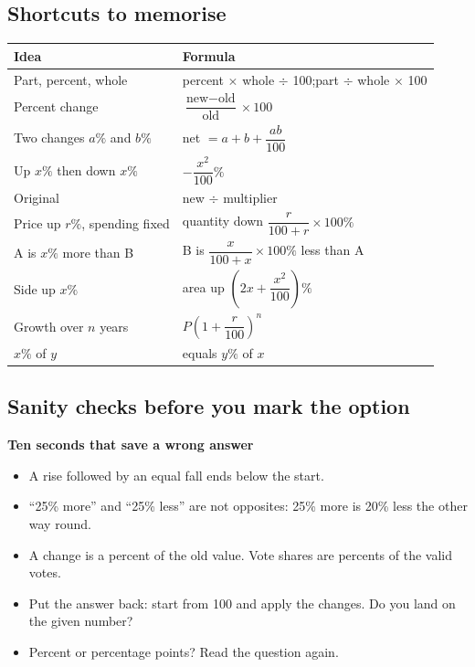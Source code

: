 \documentclass[11pt,a4paper]{article}
\let\oldsubsection\subsection
\renewcommand{\subsection}{\needspace{9\baselineskip}\oldsubsection}
\newcommand{\infobox}[2]{\par\medskip\noindent\begingroup\setlength{\fboxsep}{7pt}%
  \colorbox{codebg}{\parbox{\dimexpr\linewidth-14pt\relax}{\textbf{\color{ember}#1}\par\smallskip #2}}\endgroup\par\medskip}
\begin{document}
\subsection*{Shortcuts to memorise}
\begin{center}\small\renewcommand{\arraystretch}{1.9}\setlength{\tabcolsep}{8pt}
\begin{tabularx}{\linewidth}{@{}>{\raggedright\arraybackslash}X>{\raggedright\arraybackslash}X@{}}
\toprule
\textbf{\color{slate}Idea} & \textbf{\color{slate}Formula} \\ \midrule
Part, percent, whole & percent $\times$ whole $\div$ 100;\quad part $\div$ whole $\times$ 100 \\
Percent change & $\dfrac{\text{new}-\text{old}}{\text{old}}\times 100$ \\
Two changes $a\%$ and $b\%$ & net $=a+b+\dfrac{ab}{100}$ \\
Up $x\%$ then down $x\%$ & $-\dfrac{x^2}{100}\%$ \\
Original & new $\div$ multiplier \\
Price up $r\%$, spending fixed & quantity down $\dfrac{r}{100+r}\times 100\%$ \\
A is $x\%$ more than B & B is $\dfrac{x}{100+x}\times 100\%$ less than A \\
Side up $x\%$ & area up $\left(2x+\dfrac{x^2}{100}\right)\%$ \\
Growth over $n$ years & $P\left(1+\dfrac{r}{100}\right)^n$ \\
$x\%$ of $y$ & equals $y\%$ of $x$ \\
\bottomrule
\end{tabularx}\end{center}

\subsection*{Sanity checks before you mark the option}
\infobox{Ten seconds that save a wrong answer}{
\begin{itemize}
\item A rise followed by an equal fall ends below the start.
\item ``25\% more'' and ``25\% less'' are not opposites: 25\% more is 20\% less the other way round.
\item A change is a percent of the old value. Vote shares are percents of the valid votes.
\item Put the answer back: start from 100 and apply the changes. Do you land on the given number?
\item Percent or percentage points? Read the question again.
\end{itemize}}
\end{document}
